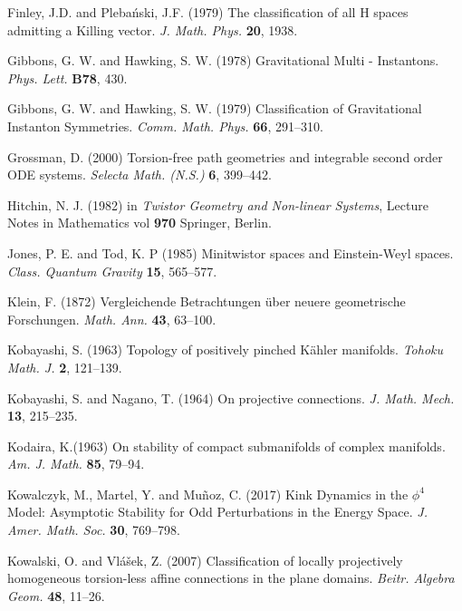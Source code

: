 \begin{thebibliography}{}
 Finley, J.D. and Pleba\'nski, J.F. (1979) The classification of all H spaces admitting a Killing
vector. \textit{J. Math. Phys.} {\bf 20}, 1938.



Gibbons, G. W. and Hawking, S. W. (1978)
Gravitational Multi - Instantons.
\textit{Phys. Lett.} \textbf{B78},
430.

 Gibbons, G. W. and Hawking, S. W. (1979) Classification of Gravitational Instanton Symmetries.
\textit{Comm. Math. Phys.} {\bf 66}, 291--310.




 Grossman, D. (2000) Torsion-free path geometries and integrable second order ODE systems. \textit{Selecta
Math. (N.S.)} {\bf 6}, 399--442.

 Hitchin, N. J. (1982) in {\em Twistor Geometry and Non-linear Systems}, Lecture Notes in Mathematics vol {\bf 970} Springer, Berlin.

Jones, P. E. and  Tod, K. P (1985)
Minitwistor spaces and Einstein-Weyl spaces. 
\textit{Class. Quantum Gravity} {\bf 15}, 565--577.

 Klein, F. (1872)
Vergleichende Betrachtungen \"uber neuere geometrische Forschungen. \textit{Math. Ann.} {\bf 43}, 63--100.



Kobayashi, S. (1963)
Topology of positively pinched K\"ahler manifolds.
\textit{Tohoku Math. J.} {\bf 2}, 121--139.

 Kobayashi, S. and Nagano, T. (1964)
On projective connections. \textit{J. Math. Mech.} {\bf 13}, 215--235.

 Kodaira, K.(1963)
On stability of compact submanifolds of complex manifolds.
\textit{Am. J. Math.} {\bf 85}, 79--94.

 Kowalczyk, M., Martel, Y. and Mu\~noz, C. (2017)
Kink Dynamics in the $\phi^4$ Model: Asymptotic Stability for Odd Perturbations in the Energy Space. \textit{J. Amer. Math. Soc.} {\bf 30}, 769--798.

 Kowalski, O. and Vl\' a\v sek, Z. (2007)
Classification of locally projectively homogeneous torsion-less affine connections in the plane domains. \textit{Beitr. Algebra Geom.} {\bf 48}, 11--26.


\end{thebibliography}
